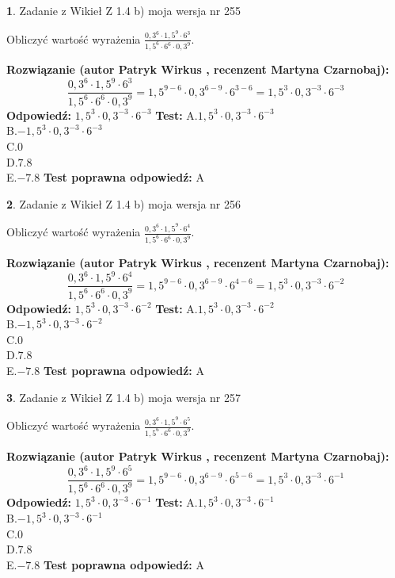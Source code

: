 \documentclass[12pt, a4paper]{article}
\theoremstyle{definition} %
\newtheorem{zad}{}
\newcommand{\zadStart}[1]{\begin{zad}#1\newline}
\newcommand{\zadStop}{\end{zad}}
\newcommand{\rozwStart}[2]{\noindent \textbf{Rozwiązanie (autor #1 , recenzent #2): }\newline}
\newcommand{\rozwStop}{\newline}
\newcommand{\odpStart}{\noindent \textbf{Odpowiedź:}\newline}
\newcommand{\odpStop}{\newline}
\newcommand{\testStart}{\noindent \textbf{Test:}\newline}
\newcommand{\testStop}{\newline}
\newcommand{\kluczStart}{\noindent \textbf{Test poprawna odpowiedź:}\newline}
\newcommand{\kluczStop}{\newline}
\begin{document}
\zadStart{Zadanie z Wikieł Z 1.4 b) moja wersja nr 255}

Obliczyć wartość wyrażenia $\frac{0,3^{6}\cdot1,5^{9}\cdot6^{3}}{1,5^{6}\cdot6^{6}\cdot0,3^{9}}$.
\zadStop
\rozwStart{Patryk Wirkus}{Martyna Czarnobaj}
$$\frac{0,3^{6}\cdot1,5^{9}\cdot6^{3}}{1,5^{6}\cdot6^{6}\cdot0,3^{9}} = 1,5^{9-6} \cdot 0,3^{6-9} \cdot 6^{3-6} = 1,5^{3} \cdot 0,3^{-3} \cdot 6^{-3}$$
\rozwStop
\odpStart
$1,5^{3} \cdot 0,3^{-3} \cdot 6^{-3}$
\odpStop
\testStart
A.$1,5^{3} \cdot 0,3^{-3} \cdot 6^{-3}$\\ B.$-1,5^{3} \cdot 0,3^{-3} \cdot 6^{-3}$\\ C.$0$\\ D.$7.8$\\ E.$-7.8$
\testStop
\kluczStart
A
\kluczStop



\zadStart{Zadanie z Wikieł Z 1.4 b) moja wersja nr 256}

Obliczyć wartość wyrażenia $\frac{0,3^{6}\cdot1,5^{9}\cdot6^{4}}{1,5^{6}\cdot6^{6}\cdot0,3^{9}}$.
\zadStop
\rozwStart{Patryk Wirkus}{Martyna Czarnobaj}
$$\frac{0,3^{6}\cdot1,5^{9}\cdot6^{4}}{1,5^{6}\cdot6^{6}\cdot0,3^{9}} = 1,5^{9-6} \cdot 0,3^{6-9} \cdot 6^{4-6} = 1,5^{3} \cdot 0,3^{-3} \cdot 6^{-2}$$
\rozwStop
\odpStart
$1,5^{3} \cdot 0,3^{-3} \cdot 6^{-2}$
\odpStop
\testStart
A.$1,5^{3} \cdot 0,3^{-3} \cdot 6^{-2}$\\ B.$-1,5^{3} \cdot 0,3^{-3} \cdot 6^{-2}$\\ C.$0$\\ D.$7.8$\\ E.$-7.8$
\testStop
\kluczStart
A
\kluczStop



\zadStart{Zadanie z Wikieł Z 1.4 b) moja wersja nr 257}

Obliczyć wartość wyrażenia $\frac{0,3^{6}\cdot1,5^{9}\cdot6^{5}}{1,5^{6}\cdot6^{6}\cdot0,3^{9}}$.
\zadStop
\rozwStart{Patryk Wirkus}{Martyna Czarnobaj}
$$\frac{0,3^{6}\cdot1,5^{9}\cdot6^{5}}{1,5^{6}\cdot6^{6}\cdot0,3^{9}} = 1,5^{9-6} \cdot 0,3^{6-9} \cdot 6^{5-6} = 1,5^{3} \cdot 0,3^{-3} \cdot 6^{-1}$$
\rozwStop
\odpStart
$1,5^{3} \cdot 0,3^{-3} \cdot 6^{-1}$
\odpStop
\testStart
A.$1,5^{3} \cdot 0,3^{-3} \cdot 6^{-1}$\\ B.$-1,5^{3} \cdot 0,3^{-3} \cdot 6^{-1}$\\ C.$0$\\ D.$7.8$\\ E.$-7.8$
\testStop
\kluczStart
A
\kluczStop
\end{document}
